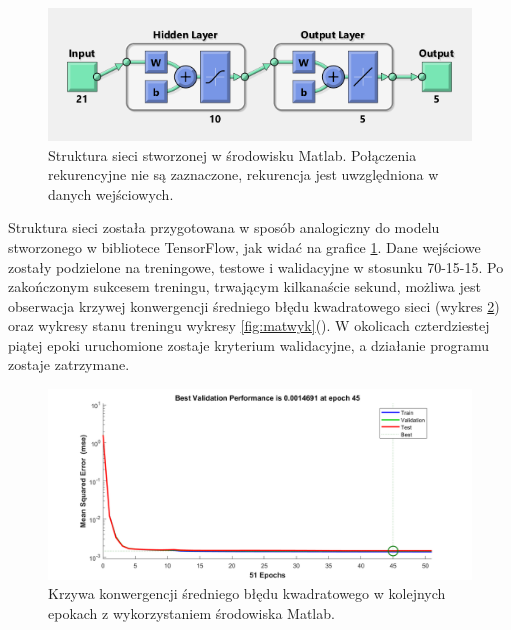 \documentclass[12pt, a4paper]{article}
\begin{document}
 \begin{figure}[ht]
    \centering
    \includegraphics[width=1\textwidth]{siecmatlab}
    \caption{Struktura sieci stworzonej w środowisku Matlab. Połączenia rekurencyjne nie są zaznaczone, rekurencja jest uwzględniona w danych wejściowych.}
    \label{fig:siecmatlab}
\end{figure}

Struktura sieci została przygotowana w sposób analogiczny do modelu stworzonego w bibliotece TensorFlow, jak widać na grafice \ref{fig:siecmatlab}. Dane wejściowe zostały podzielone na treningowe, testowe i walidacyjne w stosunku 70-15-15. Po zakończonym sukcesem treningu, trwającym kilkanaście sekund, możliwa jest obserwacja krzywej konwergencji średniego błędu kwadratowego sieci (wykres \ref{fig:matper}) oraz wykresy stanu treningu wykresy \ref{fig:matwyk}(). W okolicach czterdziestej piątej epoki uruchomione zostaje kryterium walidacyjne, a działanie programu zostaje zatrzymane.


 \begin{figure}[ht]
    \centering
    \includegraphics[width=1\textwidth]{performance}
    \caption{Krzywa konwergencji średniego błędu kwadratowego w kolejnych epokach z wykorzystaniem środowiska Matlab.}
    \label{fig:matper}
\end{figure}
\end{document}
